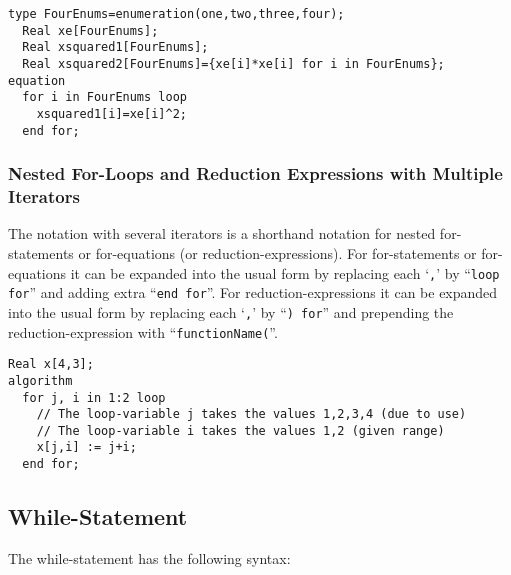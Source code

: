 \begin{example}
\begin{lstlisting}[language=modelica]
  type FourEnums=enumeration(one,two,three,four);
  Real xe[FourEnums];
  Real xsquared1[FourEnums];
  Real xsquared2[FourEnums]={xe[i]*xe[i] for i in FourEnums};
equation
  for i in FourEnums loop
    xsquared1[i]=xe[i]^2;
  end for;
\end{lstlisting}
\end{example}

\subsubsection{Nested For-Loops and Reduction Expressions with Multiple Iterators}

The notation with several iterators is a shorthand notation for nested
for-statements or for-equations (or reduction-expressions). For
for-statements or for-equations it can be expanded into the usual form
by replacing each `\lstinline!,!' by ``\lstinline!loop for!'' and adding extra ``\lstinline!end for!''. For
reduction-expressions it can be expanded into the usual form by
replacing each `\lstinline!,!' by ``\lstinline!) for!'' and prepending the reduction-expression
with ``\lstinline!functionName(!''.

\begin{example}
\begin{lstlisting}[language=modelica]
  Real x[4,3];
algorithm
  for j, i in 1:2 loop
    // The loop-variable j takes the values 1,2,3,4 (due to use)
    // The loop-variable i takes the values 1,2 (given range)
    x[j,i] := j+i;
  end for;
\end{lstlisting}
\end{example}

\subsection{While-Statement}

The while-statement has the following syntax:

